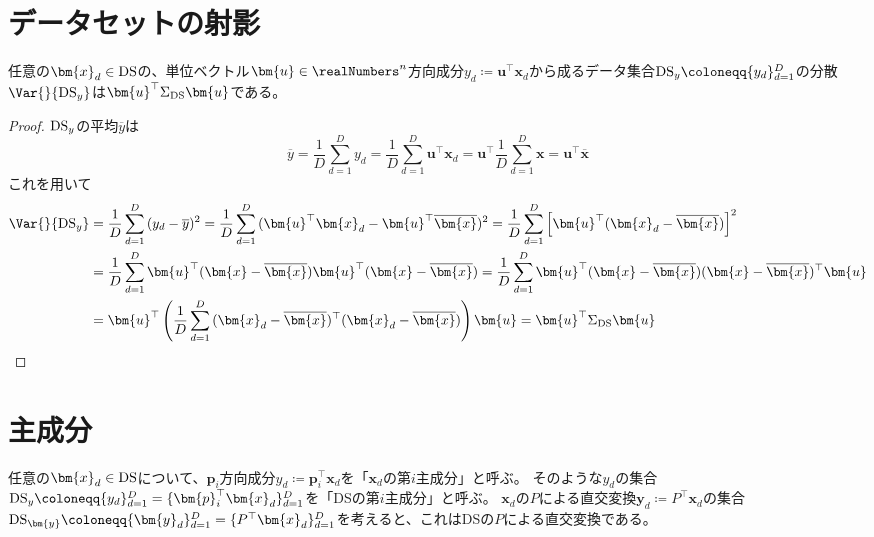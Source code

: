     \section{データセットの射影}
        \begin{shadebox}
            任意の$\bm{x}_d\in\DS$の、単位ベクトル$\bm{u}\in\realNumbers^n$方向成分$y_d\coloneqq\bm{u}^\top\bm{x}_d$から成るデータ集合$\DS_y\coloneqq\{y_d\}_{d=1}^D$の分散$\Var{}{\DS_y}$は$\bm{u}^\top\Sigma_\DS\bm{u}$である。
        \end{shadebox}
        \begin{proof}
            \quad\par
            $\textrm{DS}_y$の平均$\overline{y}$は
            \[\overline{y} = \frac{1}{D}\sum_{d=1}^{D}{y_d} = \frac{1}{D}\sum_{d=1}^{D}{\bm{u}^\top\bm{x}_d} = \bm{u}^\top\frac{1}{D}\sum_{d=1}^{D}{\bm{x}} = \bm{u}^\top\overline{\bm{x}}\]
            これを用いて
            \begin{align*}
                \Var{}{\DS_y} &= \frac{1}{D}\sum_{d=1}^{D}{(y_d-\overline{y})^2} = \frac{1}{D}\sum_{d=1}^{D}{(\bm{u}^\top\bm{x}_d-\bm{u}^\top\overline{\bm{x}})^2} = \frac{1}{D}\sum_{d=1}^{D}{\left[\bm{u}^\top(\bm{x}_d-\overline{\bm{x}})\right]^2} \\
                &= \frac{1}{D}\sum_{d=1}^{D}{\bm{u}^\top(\bm{x}-\overline{\bm{x}})\bm{u}^\top(\bm{x}-\overline{\bm{x}})} = \frac{1}{D}\sum_{d=1}^{D}{\bm{u}^\top(\bm{x}-\overline{\bm{x}})(\bm{x}-\overline{\bm{x}})^\top\bm{u}} \\
                &= \bm{u}^\top\left(\frac{1}{D}\sum_{d=1}^D{(\bm{x}_d-\overline{\bm{x}})^\top(\bm{x}_d-\overline{\bm{x}})}\right)\bm{u} = \bm{u}^\top\Sigma_\DS\bm{u}
            \end{align*}
        \end{proof}
    \section{主成分}
        任意の$\bm{x}_d\in\DS$について、$\bm{p}_i$方向成分$y_d\coloneqq\bm{p}_i^\top\bm{x}_d$を「$\bm{x}_d$の第$i$主成分」と呼ぶ。
        そのような$y_d$の集合$\DS_y\coloneqq\{y_d\}_{d=1}^D = \{\bm{p}_i^\top\bm{x}_d\}_{d=1}^D$を「DSの第$i$主成分」と呼ぶ。
        $\bm{x}_d$の$P$による直交変換$\bm{y}_d\coloneqq P^\top\bm{x}_d$の集合$\DS_{\bm{y}}\coloneqq\{\bm{y}_d\}_{d=1}^D = \{P^\top\bm{x}_d\}_{d=1}^D$を考えると、これはDSの$P$による直交変換である。
